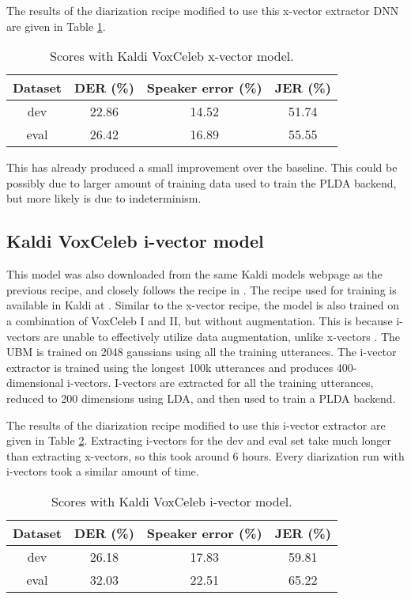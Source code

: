 			The results of the diarization recipe modified to use this x-vector extractor DNN are given in Table \ref{table-kaldi-xvec}.
	
			\begin{table}[h]
			\centering
			\begin{tabular}{|c|c|c|c|}
				\hline
				Dataset & DER (\%) & Speaker error (\%) & JER (\%) \\
				\hline
				dev & 22.86 & 14.52 & 51.74 \\
				\hline
				eval & 26.42 & 16.89 & 55.55 \\
				\hline
			\end{tabular}
			\caption{Scores with Kaldi VoxCeleb x-vector model.}
			\label{table-kaldi-xvec}
			\end{table}
		
			This has already produced a small improvement over the baseline. This could be possibly due to larger amount of training data used to train the PLDA backend, but more likely is due to indeterminism.
		
		\subsection{Kaldi VoxCeleb i-vector model}
			This model was also downloaded from the same Kaldi models webpage as the previous recipe, and closely follows the recipe in \cite{snyder2018x}. The recipe used for training is available in Kaldi at . Similar to the x-vector recipe, the model is also trained on a combination of VoxCeleb I and II, but without augmentation. This is because i-vectors are unable to effectively utilize data augmentation, unlike x-vectors \cite{snyder2018x}. The UBM is trained on 2048 gaussians using all the training utterances. The i-vector extractor is trained using the longest 100k utterances and produces 400-dimensional i-vectors. I-vectors are extracted for all the training utterances, reduced to 200 dimensions using LDA, and then used to train a PLDA backend.
			
			The results of the diarization recipe modified to use this i-vector extractor are given in Table \ref{table-kaldi-ivec}. Extracting i-vectors for the dev and eval set take much longer than extracting x-vectors, so this took around 6 hours. Every diarization run with i-vectors took a similar amount of time.
			
			\begin{table}[h]
				\centering
				\begin{tabular}{|c|c|c|c|}
					\hline
					Dataset & DER (\%) & Speaker error (\%) & JER (\%) \\
					\hline
					dev & 26.18 & 17.83 & 59.81 \\
					\hline
					eval & 32.03 & 22.51 & 65.22 \\
					\hline
				\end{tabular}
				\caption{Scores with Kaldi VoxCeleb i-vector model.}
				\label{table-kaldi-ivec}
			\end{table}
		
